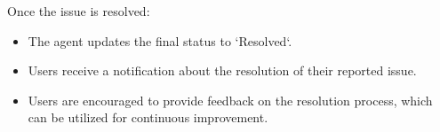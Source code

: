 Once the issue is resolved:
\begin{itemize}
    \item The agent updates the final status to `Resolved`.
    \item Users receive a notification about the resolution of their reported issue.
    \item Users are encouraged to provide feedback on the resolution process, which can be utilized for continuous improvement.
\end{itemize}
